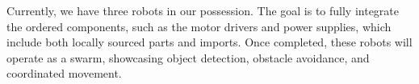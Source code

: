Currently, we have three robots in our possession. The goal is to fully integrate the ordered components, such as the motor drivers and power supplies, which include both locally sourced parts and imports. Once completed, these robots will operate as a swarm, showcasing object detection, obstacle avoidance, and coordinated movement.
